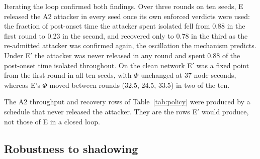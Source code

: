\documentclass[pdflatex,sn-mathphys-num]{sn-jnl}%
\theoremstyle{thmstyleone}%
\theoremstyle{thmstyletwo}%
\theoremstyle{thmstylethree}%
\begin{document}
Iterating the loop confirmed both findings. Over three rounds on ten seeds,
E released the A2 attacker in every seed once its own enforced verdicts were
used: the fraction of post-onset time the attacker spent isolated fell from
0.88 in the first round to 0.23 in the second, and recovered only to 0.78 in
the third as the re-admitted attacker was confirmed again, the oscillation the
mechanism predicts. Under E$'$ the attacker was never released in any round
and spent 0.88 of the post-onset time isolated throughout. On the clean
network E$'$ was a fixed point from the first round in all ten seeds, with
$\Phi$ unchanged at 37 node-seconds, whereas E's $\Phi$ moved between rounds
(32.5, 24.5, 33.5) in two of the ten.

The A2 throughput and recovery rows of Table~\ref{tab:policy} were produced
by a schedule that never released the attacker. They are the rows E$'$ would
produce, not those of E in a closed loop.

\subsection{Robustness to shadowing}
\label{sec:shadow}
\end{document}
